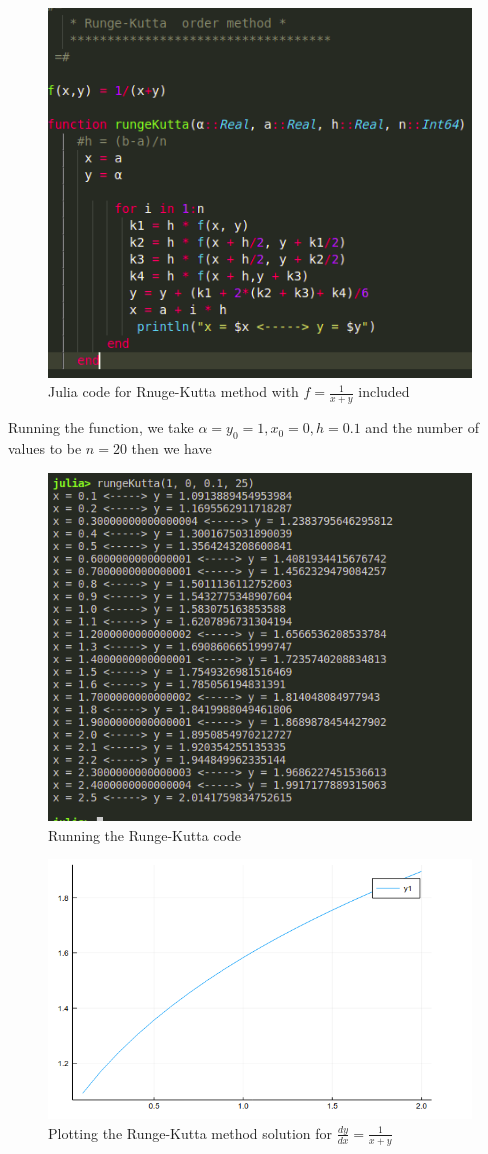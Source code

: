 \documentclass[a4paper,12pt,openany]{book}
\begin{document}
\begin{soln}
\begin{figure}[H]
	\centering
	\includegraphics[width = .7\linewidth]{pic2}
	\caption{Julia code for Rnuge-Kutta method with $f = \frac{1}{x+y}$ included}
\end{figure}
Running the function, we take $\alpha = y_0 = 1,x_0 = 0, h=0.1$ and the number of values to be $n = 20$ then we have 
\begin{figure}[H]
	\centering
	\includegraphics[width = .7\linewidth]{pic3}
	\caption{Running the Runge-Kutta code}
\end{figure}

\begin{figure}[H]
	\centering
	\includegraphics[width = .7\linewidth]{pic23}
	\caption{Plotting the Runge-Kutta method solution for $\frac{dy}{dx} = \frac{1}{x+y}$}
\end{figure}


\end{soln}
\end{document}
